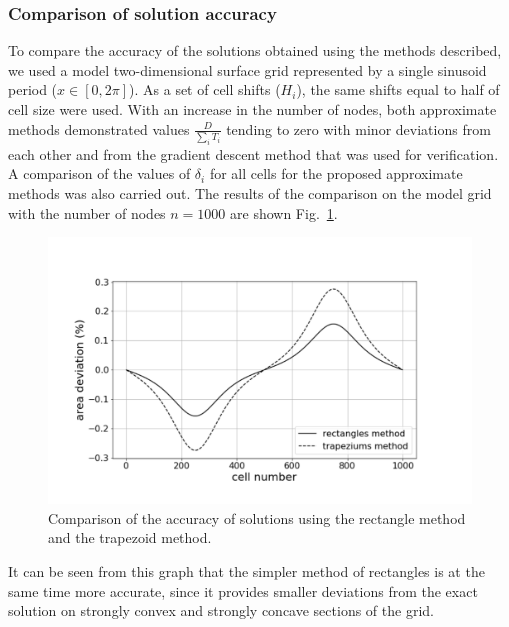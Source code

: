 \subsubsection{Comparison of solution accuracy}

To compare the accuracy of the solutions obtained using the methods described, we used a model two-dimensional surface grid represented by a single sinusoid period ($x \in [0, 2 \pi]$).
As a set of cell shifts ($ H_i $), the same shifts equal to half of cell size were used.
With an increase in the number of nodes, both approximate methods demonstrated values $\frac{D}{\sum_i{T_i}}$ tending to zero with minor deviations from each other and from the gradient descent method that was used for verification.
A comparison of the values of $\delta_i$ for all cells for the proposed approximate methods was also carried out.
The results of the comparison on the model grid with the number of nodes $n = 1000$ are shown Fig.~\ref{fig:graphic}.

\begin{figure}[h]
\onelinecaptionstrue
\centering
\includegraphics[width=1.0\textwidth]{pics/text_1_remesh_2d/graphic.pdf}
\caption{Comparison of the accuracy of solutions using the rectangle method and the trapezoid method.}
\label{fig:graphic}
\end{figure}

It can be seen from this graph that the simpler method of rectangles is at the same time more accurate, since it provides smaller deviations from the exact solution on strongly convex and strongly concave sections of the grid.
